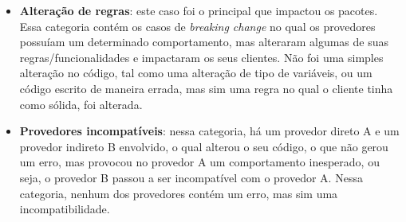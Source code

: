 \begin{itemize}
    \item \textbf{Alteração de regras}: este caso foi o principal que impactou os pacotes. Essa categoria contém os casos de \textit{breaking change} no qual os provedores possuíam um determinado comportamento, mas alteraram algumas de suas regras/funcionalidades e impactaram os seus clientes. Não foi uma simples alteração no código, tal como uma alteração de tipo de variáveis, ou um código escrito de maneira errada, mas sim uma regra no qual o cliente tinha como sólida, foi alterada. %



    \item \textbf{Provedores incompatíveis}: nessa categoria, há um provedor direto A e um provedor indireto B envolvido, o qual alterou o seu código, o que não gerou um erro, mas provocou no provedor A um comportamento inesperado, ou seja, o provedor B passou a ser incompatível com o provedor A. Nessa categoria, nenhum dos provedores contém um erro, mas sim uma incompatibilidade. %



\end{itemize}
